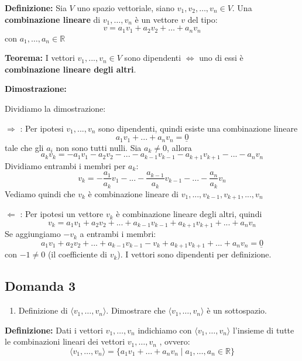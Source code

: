 \documentclass[
  a4paper,
]{article}
\providecommand{\tightlist}{%
  \setlength{\itemsep}{0pt}\setlength{\parskip}{0pt}}
\providecommand{\tightlist}{}
\begin{document}
\textbf{Definizione:} Sia \(V\) uno spazio vettoriale, siano
\(v_1, v_2, \dots, v_n \in V\). Una \textbf{combinazione lineare} di
\(v_1, \dots, v_n\) è un vettore \(v\) del tipo: \[
v = a_1v_1 + a_2v_2 + \dots + a_nv_n
\] con \(a_1, \dots ,a_n \in \mathbb{R}\)

\textbf{Teorema:} I vettori \(v_1, ..., v_n \in V\) sono dipendenti
\(\iff\) uno di essi è \textbf{combinazione lineare degli altri}.

\textbf{Dimostrazione:}

Dividiamo la dimostrazione:

\(\Rightarrow\) : Per ipotesi \(v_1, ..., v_n\) sono dipendenti, quindi
esiste una combinazione lineare \[
a_1v_1 + ... + a_n v_n = \underline{0} 
\] tale che gli \(a_i\) non sono tutti nulli. Sia \(a_k \neq 0\), allora
\[
a_k v_k = - a_1 v_1 -a_2 v_2 - ... - a_{k-1}v_{k-1}-a_{k+1}v_{k+1} -...- a_n v_n
\] Dividiamo entrambi i membri per \(a_k\): \[
v_k = - \frac{a_1}{a_k} v_1 - ... - \frac{a_{k-1}}{a_k}v_{k-1} -... - \frac{a_n}{a_k}v_n
\] Vediamo quindi che \(v_k\) è combinazione lineare di
\(v_1, ..., v_{k-1}, v_{k+1}, ..., v_n\)

\(\Leftarrow\) : Per ipotesi un vettore \(v_k\) è combinazione lineare
degli altri, quindi \[
v_k = a_1 v_1 + a_2 v_2 + ... + a_{k-1}v_{k-1}+a_{k+1}v_{k+1} +...+ a_n v_n
\] Se aggiungiamo \(-v_k\) a entrambi i membri: \[
a_1 v_1 + a_2 v_2 + ... + a_{k-1}v_{k-1}-v_k +a_{k+1}v_{k+1} +...+ a_n v_n = \underline{0}
\] con \(-1 \neq 0\) (il coefficiente di \(v_k\)). I vettori sono
dipendenti per definizione.

\hypertarget{domanda-3}{%
\subsection{Domanda 3}\label{domanda-3}}

\begin{observationbox}[Domanda]
\begin{enumerate}
\def\labelenumi{\arabic{enumi}.}
\setcounter{enumi}{2}
\tightlist
\item
  Definizione di \(\langle v_1,\ldots,v_n\rangle\). Dimostrare che
  \(\langle v_1,\ldots,v_n\rangle\) è un sottospazio.
\end{enumerate}
\end{observationbox}

\textbf{Definizione:} Dati i vettori \(v_1,\ldots,v_n\) indichiamo con
\(\langle v_1,\ldots,v_n\rangle\) l'insieme di tutte le combinazioni
lineari dei vettori \(v_1,\ldots,v_n\) , ovvero: \[
\langle v_1, \dots, v_n \rangle = \{a_1v_1 + \dots + a_n v_n \mid a_1, \dots, a_n \in \mathbb{R}\}
\]
\end{document}
